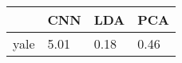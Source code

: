 \begin{tabular}{|r|l|l|l|}
  \hline
    & CNN & LDA & PCA \\
  \hline
  yale & 5.01 & 0.18 & 0.46 \\
  \hline
\end{tabular}
